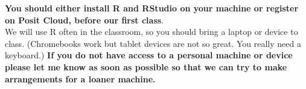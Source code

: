 {\bf You should either install R and RStudio on your machine or register on Posit Cloud, before our first class}. \\

We will use R often in the classroom, so you should bring a laptop or device to class. (Chromebooks work but tablet devices are not so great. You really need a keyboard.) {\bf If you do not have access to a personal machine or device please let me know as soon as possible so that we can try to make arrangements for a loaner machine.}




